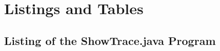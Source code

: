 %
%

\chapter{Listings and Tables}

\section{Listing of the ShowTrace.java Program}
\label{sec:ShowTracePrg}


